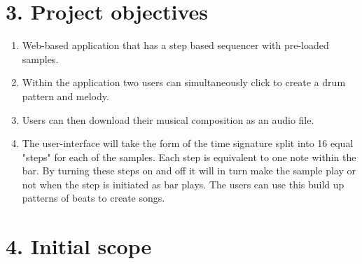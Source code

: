 \documentclass[a4paper]{article}
\begin{document}
\section{3. Project objectives}

\begin{enumerate}
    \item Web-based application that has a step based sequencer with pre-loaded samples.
    \item Within the application two users can simultaneously click to create a drum pattern and melody.
    \item Users can then download their musical composition as an audio file.
    \item The user-interface will take the form of the time signature split into 16 equal "steps" for each of the samples. Each step is equivalent to one note within the bar. By turning these steps on and off it will in turn make the sample play or not when the step is initiated as bar plays. The users can use this build up patterns of beats to create songs.
\end{enumerate}

\section{4. Initial scope}
\end{document}
